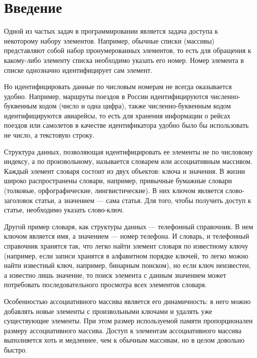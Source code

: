 \documentclass[12pt]{report}
\begin{document}
	
	\newpage
	\tableofcontents
    \chapter*{Введение}
    
    Одной из частых задач в программировании является задача доступа к некоторому набору элементов. Например, обычные списки (массивы) представляют собой набор пронумерованных элементов, то есть для обращения к какому-либо элементу списка необходимо указать его номер. Номер элемента в списке однозначно идентифицирует сам элемент.
    
    Но идентифицировать данные по числовым номерам не всегда оказывается удобно. Например, маршруты поездов в России идентифицируются численно-буквенным кодом (число и одна цифра), также численно-буквенным кодом идентифицируются авиарейсы, то есть для хранения информации о рейсах поездов или самолетов в качестве идентификатора удобно было бы использовать не число, а текстовую строку.
    
    Структура данных, позволяющая идентифицировать ее элементы не по числовому индексу, а по произвольному, называется словарем или ассоциативным массивом. Каждый элемент словаря состоит из двух объектов: ключа и значения. 
    В жизни широко распространены словари, например, привычные бумажные словари (толковые, орфографические, лингвистические). В них ключом является слово-заголовок статьи, а значением — сама статья. Для того, чтобы получить доступ к статье, необходимо указать слово-ключ.
    
    Другой пример словаря, как структуры данных — телефонный справочник. В нем ключом является имя, а значением — номер телефона. И словарь, и телефонный справочник хранятся так, что легко найти элемент словаря по известному ключу (например, если записи хранятся в алфавитном порядке ключей, то легко можно найти известный ключ, например, бинарным поиском), но если ключ неизвестен, а известно лишь значение, то поиск элемента с данным значением может потребовать последовательного просмотра всех элементов словаря.
    
    Особенностью ассоциативного массива является его динамичность: в него можно добавлять новые элементы с произвольными ключами и удалять уже существующие элементы. При этом размер используемой памяти пропорционален размеру ассоциативного массива. Доступ к элементам ассоциативного массива выполняется хоть и медленнее, чем к обычным массивам, но в целом довольно быстро.
    
\end{document}
